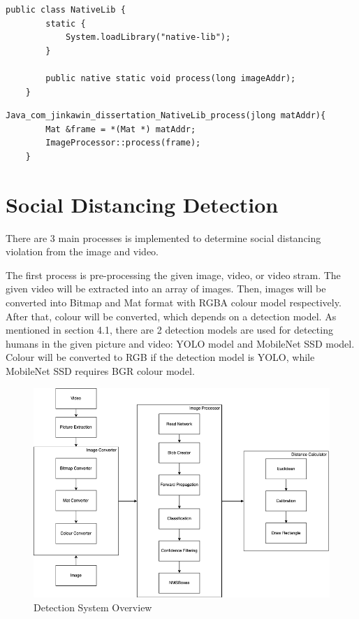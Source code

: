 \begin{lstlisting}[caption={Java Native Function},captionpos=b]
    public class NativeLib {
        static {
            System.loadLibrary("native-lib");
        }

        public native static void process(long imageAddr);
    }
\end{lstlisting}

\begin{lstlisting}[caption={C++ JNI Method},captionpos=b]
    Java_com_jinkawin_dissertation_NativeLib_process(jlong matAddr){
        Mat &frame = *(Mat *) matAddr;
        ImageProcessor::process(frame);
    }
\end{lstlisting}

    \section{Social Distancing Detection}
        There are 3 main processes is implemented to determine social distancing violation from the image and video.

        The first process is pre-processing the given image, video, or video stram.
        The given video will be extracted into an array of images.
        Then, images will be converted into Bitmap and Mat format with RGBA colour model respectively.
        After that, colour will be converted, which depends on a detection model.
        As mentioned in section 4.1, there are 2 detection models are used for detecting humans in the given picture and video: YOLO model and MobileNet SSD model.
        Colour will be converted to RGB if the detection model is YOLO,
        while MobileNet SSD requires BGR colour model.

        \begin{figure}[!ht]
            \centering
            \includegraphics[width=5in]{images/chapter3/system-overview.png}
            \caption{Detection System Overview}
            \label{systemOverview}
        \end{figure}

